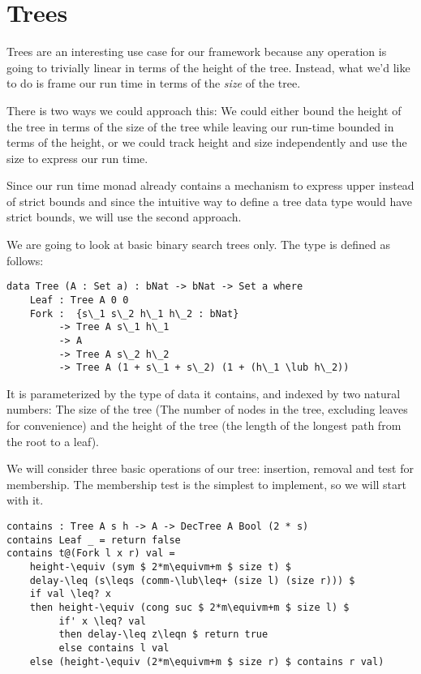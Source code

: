 
\section{Trees}
Trees are an interesting use case for our framework because any operation is going to trivially linear in terms of the height of the tree. Instead, what we'd like to do is frame our run time in terms of the \emph{size} of the tree.

There is two ways we could approach this: We could either bound the height of the tree in terms of the size of the tree while leaving our run-time bounded in terms of the height, or we could track height and size independently and use the size to express our run time.

Since our run time monad already contains a mechanism to express upper instead of strict bounds and since the intuitive way to define a tree data type would have strict bounds, we will use the second approach.

We are going to look at basic binary search trees only. The type is defined as follows:

\begin{lstlisting}[caption={The Tree Type},label={lst:tree:def},emph={Tree,Leaf,Fork}]
data Tree (A : Set a) : bNat -> bNat -> Set a where
    Leaf : Tree A 0 0
    Fork :  {s\_1 s\_2 h\_1 h\_2 : bNat}
         -> Tree A s\_1 h\_1
         -> A
         -> Tree A s\_2 h\_2
         -> Tree A (1 + s\_1 + s\_2) (1 + (h\_1 \lub h\_2))
\end{lstlisting}

It is parameterized by the type of data it contains, and indexed by two natural numbers: The size of the tree (The number of nodes in the tree, excluding leaves for convenience) and the height of the tree (the length of the longest path from the root to a leaf).

We will consider three basic operations of our tree: insertion, removal and test for membership. The membership test is the simplest to implement, so we will start with it.

\begin{lstlisting}[caption={Tree Membership Test},label={lst:tree:contains},emph={Tree,contains,Bool,Leaf,Fork,return,if,then,else}]
contains : Tree A s h -> A -> DecTree A Bool (2 * s)
contains Leaf _ = return false
contains t@(Fork l x r) val =
    height-\equiv (sym $ 2*m\equivm+m $ size t) $
    delay-\leq (s\leqs (comm-\lub\leq+ (size l) (size r))) $
    if val \leq? x
    then height-\equiv (cong suc $ 2*m\equivm+m $ size l) $
         if' x \leq? val
         then delay-\leq z\leqn $ return true
         else contains l val
    else (height-\equiv (2*m\equivm+m $ size r) $ contains r val)
\end{lstlisting}


